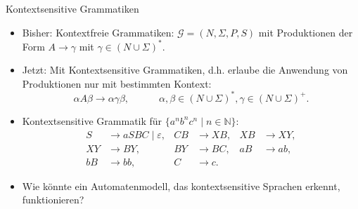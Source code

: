 \documentclass{beamer}
\begin{document}
\begin{frame}{Kontextsensitive Grammatiken}
	\begin{itemize}
		\item Bisher: Kontextfreie Grammatiken: $\mathcal{G} = (N, \Sigma, P, S)$ mit Produktionen der Form $A \to \gamma$ mit $\gamma \in (N \cup \Sigma)^\ast$.\pause
		\item Jetzt: Mit Kontextsensitive Grammatiken, d.h. erlaube die Anwendung von Produktionen nur mit bestimmten Kontext:
			$$
				\alpha A \beta \to \alpha \gamma \beta, \quad\quad\quad \alpha, \beta \in (N \cup \Sigma)^\ast, \gamma \in (N \cup \Sigma)^+.
			$$\pause
		\item Kontextsensitive Grammatik für $\{a^n b^n c^n \mid n \in \mathbb{N}\}$:
			\begin{align*}
				S &\to aSBC \mid \varepsilon, & CB &\to XB, & XB &\to XY,\\
				XY &\to BY, & BY &\to BC, & aB &\to ab,\\
				bB &\to bb, &  C &\to c.
			\end{align*}\pause
		\item Wie könnte ein Automatenmodell, das kontextsensitive Sprachen erkennt, funktionieren?
	\end{itemize}
\end{frame}

\end{document}
